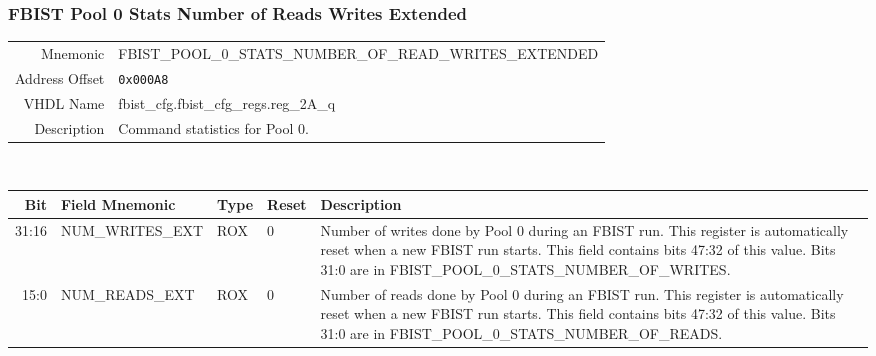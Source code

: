 \subsubsection{FBIST Pool 0 Stats Number of Reads Writes Extended}
\begin{tabular}{ r | p{350px} }
  Mnemonic       & FBIST\_POOL\_0\_STATS\_NUMBER\_OF\_READ\_WRITES\_EXTENDED \\
  Address Offset & \texttt{0x000A8}                                          \\
  VHDL Name      &  fbist\_cfg.fbist\_cfg\_regs.reg\_2A\_q                   \\ \hline

  Description &
  Command statistics for Pool 0. \\
\end{tabular}
\\
\begin{tabularx}{\textwidth}{r|l|l|l|X}
  \hline
  Bit   & Field Mnemonic   & Type & Reset & Description \\ \hline

  31:16 & NUM\_WRITES\_EXT & ROX  & 0     &

  Number of writes done by Pool 0 during an FBIST run. This register is
  automatically reset when a new FBIST run starts. This field contains
  bits 47:32 of this value. Bits 31:0 are in
  FBIST\_POOL\_0\_STATS\_NUMBER\_OF\_WRITES. \\

  15:0  & NUM\_READS\_EXT  & ROX  & 0     &

  Number of reads done by Pool 0 during an FBIST run. This register is
  automatically reset when a new FBIST run starts. This field contains
  bits 47:32 of this value. Bits 31:0 are in
  FBIST\_POOL\_0\_STATS\_NUMBER\_OF\_READS. \\
\end{tabularx}

